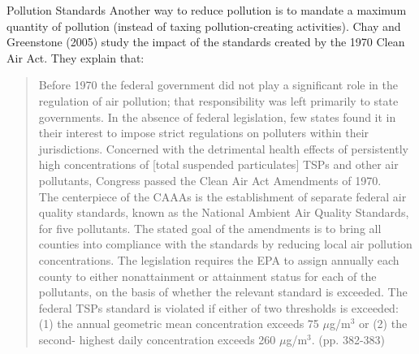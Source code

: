 \documentclass[10pt]{extarticle}
\begin{document}
  \begin{problem}{Pollution Standards}
    Another way to reduce pollution is to mandate a maximum quantity of pollution (instead of taxing pollution-creating activities). Chay and Greenstone (2005) study the impact of the standards created by the 1970 Clean Air Act. They explain that:
    \begin{quote}
      Before 1970 the federal government did not play a significant role in the regulation of air pollution; that responsibility was left primarily to state governments. In the absence of federal legislation, few states found it in their interest to impose strict regulations on polluters within their jurisdictions. Concerned with the detrimental health effects of persistently high concentrations of [total suspended particulates] TSPs and other air pollutants, Congress passed the Clean Air Act Amendments of 1970.\\

      The centerpiece of the CAAAs is the establishment of separate federal air quality standards, known as the National Ambient Air Quality Standards, for five pollutants. The stated goal of the amendments is to bring all counties into compliance with the standards by reducing local air pollution concentrations. The legislation requires the EPA to assign annually each county to either nonattainment or attainment status for each of the pollutants, on the basis of whether the relevant standard is exceeded. The federal TSPs standard is violated if either of two thresholds is exceeded: (1) the annual geometric mean concentration exceeds 75 $\mu$g/m$^3$ or (2) the second- highest daily concentration exceeds 260 $\mu$g/m$^3$. (pp. 382-383)\\


\end{quote}
\end{problem}
\end{document}
